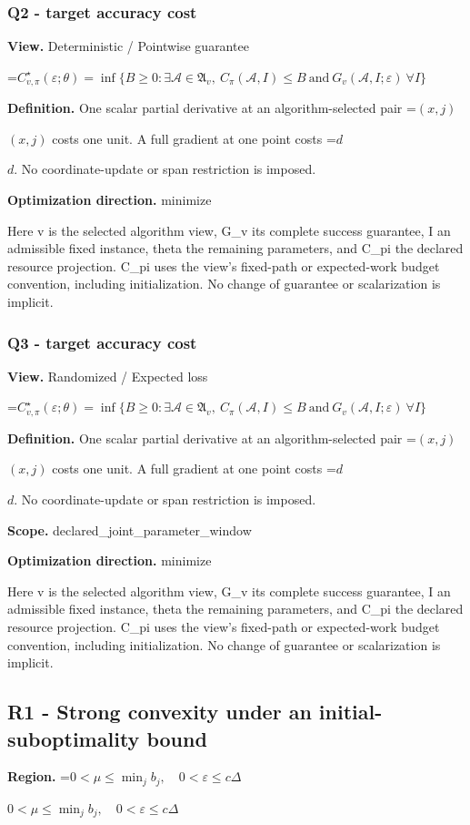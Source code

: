 \documentclass[10pt,a4paper]{article}
\newcommand{\AtlasMath}[1]{\par\begingroup\centering\setbox0=\hbox{$\displaystyle #1$}\ifdim\wd0>1.4\linewidth\typeout{ATLAS WIDE FORMULA: \the\wd0}\fi\ifdim\wd0>\linewidth\resizebox{\linewidth}{!}{\box0}\else\box0\fi\par\endgroup}
\newcommand{\AtlasInlineMath}[1]{\begingroup\setbox0=\hbox{$#1$}\ifdim\wd0>.4\linewidth\endgroup\AtlasMath{#1}\else\endgroup$#1$\fi}
\begin{document}
\subsubsection{Q2 - target accuracy cost}
\textbf{View.} Deterministic / Pointwise guarantee

\AtlasMath{C^\star_{v,\pi}(\varepsilon;\theta)=\inf\{B\ge0:\exists\mathcal A\in\mathfrak A_v,\ C_\pi(\mathcal A,I)\le B\ \text{and}\ G_v(\mathcal A,I;\varepsilon)\ \forall I\}}
\textbf{Definition.} One scalar partial derivative at an algorithm-selected pair \AtlasInlineMath{(x,j)} costs one unit. A full gradient at one point costs \AtlasInlineMath{d}. No coordinate-update or span restriction is imposed.

\textbf{Optimization direction.} minimize

Here v is the selected algorithm view, G\_v its complete success guarantee, I an admissible fixed instance, theta the remaining parameters, and C\_pi the declared resource projection. C\_pi uses the view's fixed-path or expected-work budget convention, including initialization. No change of guarantee or scalarization is implicit.

\subsubsection{Q3 - target accuracy cost}
\textbf{View.} Randomized / Expected loss

\AtlasMath{C^\star_{v,\pi}(\varepsilon;\theta)=\inf\{B\ge0:\exists\mathcal A\in\mathfrak A_v,\ C_\pi(\mathcal A,I)\le B\ \text{and}\ G_v(\mathcal A,I;\varepsilon)\ \forall I\}}
\textbf{Definition.} One scalar partial derivative at an algorithm-selected pair \AtlasInlineMath{(x,j)} costs one unit. A full gradient at one point costs \AtlasInlineMath{d}. No coordinate-update or span restriction is imposed.

\textbf{Scope.} declared\_joint\_parameter\_window

\textbf{Optimization direction.} minimize

Here v is the selected algorithm view, G\_v its complete success guarantee, I an admissible fixed instance, theta the remaining parameters, and C\_pi the declared resource projection. C\_pi uses the view's fixed-path or expected-work budget convention, including initialization. No change of guarantee or scalarization is implicit.

\subsection{R1 - Strong convexity under an initial-suboptimality bound}
\textbf{Region.} \AtlasInlineMath{0<\mu\le\min_jb_j,\quad0<\varepsilon\le c\Delta}
\end{document}
